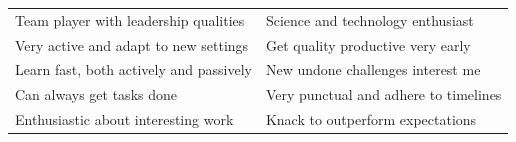 

\begin{tabularx}{\textwidth}{@{}X X@{}}
%
\makefield{\faBookmark} {Team player with leadership qualities}
%
&
%
\makefield{\faBookmark} {Science and technology enthusiast}
%
\\
%
\makefield{\faBookmark} {Very active and adapt to new settings}
%
&
%
\makefield{\faBookmark} {Get quality productive very early}
%
\\
%
\makefield{\faBookmark} {Learn fast, both actively and passively}
%
&
%
\makefield{\faBookmark} {New undone challenges interest me}
%
\\
%
\makefield{\faBookmark} {Can always get tasks done}
%
&
%
\makefield{\faBookmark} {Very punctual and adhere to timelines}
%
\\
%
\makefield{\faBookmark} {Enthusiastic about interesting work}
%
&
%
\makefield{\faBookmark} {Knack to outperform  expectations}

\\

\end{tabularx}